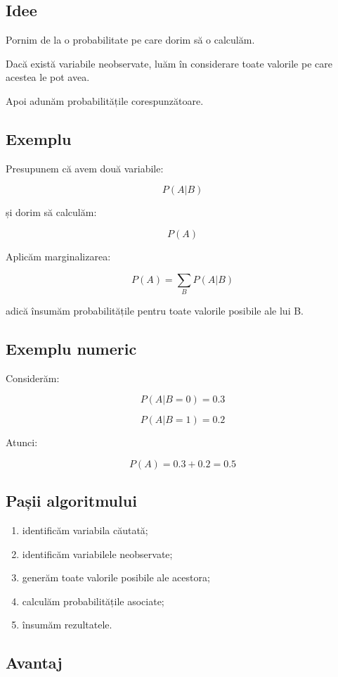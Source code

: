 \documentclass[12pt,a4paper]{article}
\begin{document}
\subsection{Idee}

Pornim de la o probabilitate pe care dorim să o calculăm.

Dacă există variabile neobservate, luăm în considerare toate valorile pe care acestea le pot avea.

Apoi adunăm probabilitățile corespunzătoare.

\subsection{Exemplu}

Presupunem că avem două variabile:

\[
P(A|B)
\]

și dorim să calculăm:

\[
P(A)
\]

Aplicăm marginalizarea:

\[
P(A)
=
\sum_B P(A|B)
\]

adică însumăm probabilitățile pentru toate valorile posibile ale lui B.

\subsection{Exemplu numeric}

Considerăm:

\[
P(A|B=0)=0.3
\]

\[
P(A|B=1)=0.2
\]

Atunci:

\[
P(A)
=
0.3+0.2
=
0.5
\]

\subsection{Pașii algoritmului}

\begin{enumerate}
\item identificăm variabila căutată;
\item identificăm variabilele neobservate;
\item generăm toate valorile posibile ale acestora;
\item calculăm probabilitățile asociate;
\item însumăm rezultatele.
\end{enumerate}

\subsection{Avantaj}
\end{document}
